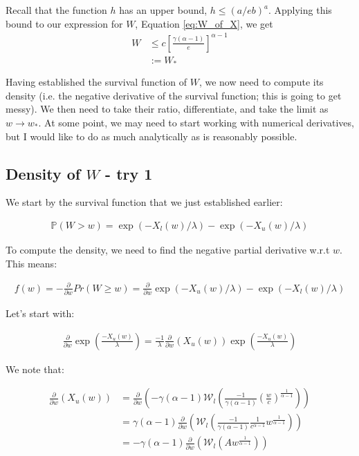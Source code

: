 \documentclass{article}
\newcommand{\bP}{\mathbb{P}}
\newcommand{\sW}{\mathscr{W}}
\begin{document}
Recall that the function $h$ has an upper bound, $h \leq (a / eb)^a$. Applying this bound to our expression for $W$, Equation \eqref{eq:W_of_X}, we get
\begin{align}
W &\leq c \left[ \frac{\gamma (\alpha - 1)}{e} \right]^{\alpha - 1}\\
&:= W_* \nonumber
\end{align}

Having established the survival function of $W$, we now need to compute its density (i.e. the negative derivative of the survival function; this is going to get messy). We then need to take their ratio, differentiate, and take the limit as $w \rightarrow w_*$. At some point, we may need to start working with numerical derivatives, but I would like to do as much analytically as is reasonably possible.

\subsection{Density of $W$ - try 1}

We start by the survival function that we just established earlier:

\begin{align}
\bP(W > w) = \exp(-X_l(w)/ \lambda) - \exp(-X_u(w)/\lambda)
\end{align}

To compute the density, we need to find the negative partial derivative w.r.t $w$. This means: 

\begin{align}
f(w) = - \frac{\partial}{\partial w} Pr(W \ge w) = \frac{\partial}{\partial w} \exp(-X_u(w)/ \lambda) - \exp(-X_l(w)/\lambda)
\end{align}

Let's start with:

\begin{align}
\frac{\partial}{\partial w} \exp \left( \frac{-X_{u}(w)}{\lambda} \right) = \frac{-1}{\lambda} \frac{\partial}{\partial w}(X_{u}(w)) \exp(\frac{-X_{u}(w)}{\lambda})
\end{align}

We note that:

\begin{align}
\frac{\partial}{\partial w}(X_{u}(w)) &= \frac{\partial}{\partial w} \left( -\gamma (\alpha - 1) \sW_l \left( \frac{-1}{\gamma (\alpha-1)} \left(\frac{w}{c}\right)^{\frac{1}{\alpha-1}} \right) \right) \\
&= \gamma (\alpha - 1) \frac{\partial}{\partial w} \left( \sW_l(\frac{-1}{\gamma (\alpha-1)} \frac{1}{c^{\alpha-1}} w^{\frac{1}{\alpha-1}})  \right) \\
&= -\gamma (\alpha-1) \frac{\partial}{\partial w} \left( \sW_l(A w^{\frac{1}{\alpha-1}}) \right)
\end{align}
\end{document}
